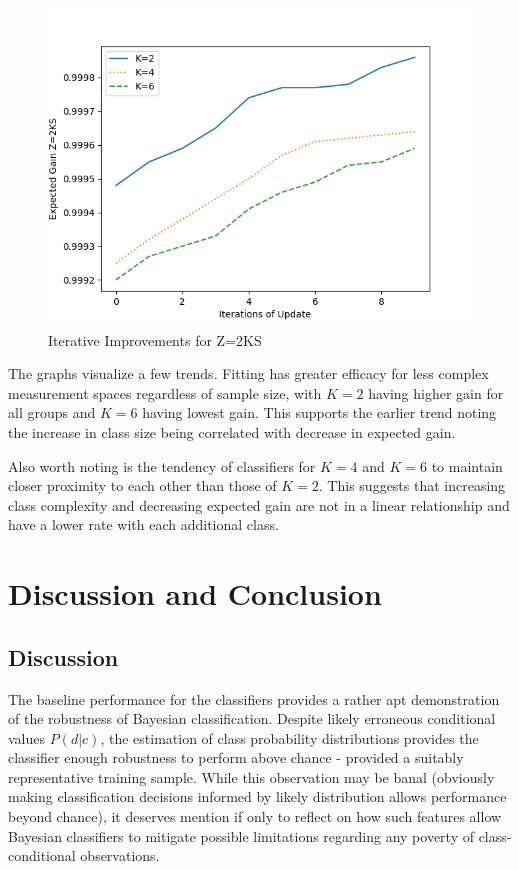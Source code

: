 \documentclass[10pt, conference]{IEEEtran}
\begin{document}
\begin{figure}[htbp]
\centerline{\includegraphics[scale=0.5]{Z_2KS.png}}
\caption{Iterative Improvements for Z=2KS}
\label{fig}
\end{figure}
The graphs visualize a few trends. Fitting has greater efficacy for less complex measurement spaces regardless of sample size, with $K=2$ having higher gain for all groups and $K=6$ having lowest gain. This supports the earlier trend noting the increase in class size being correlated with decrease in expected gain.

Also worth noting is the tendency of classifiers for $K=4$ and $K=6$ to maintain closer proximity to each other than those of $K=2$. This suggests that increasing class complexity and decreasing expected gain are not in a linear relationship and have a lower rate with each additional class. 
\section{Discussion and Conclusion}
\subsection{Discussion}
The baseline performance  for the classifiers provides a rather apt demonstration of the robustness of Bayesian classification. Despite likely erroneous conditional values $P(d|c)$, the estimation of class probability distributions provides the classifier enough robustness to perform above chance - provided a suitably representative training sample. While this observation may be banal (obviously making classification decisions informed by likely distribution allows performance beyond chance), it deserves mention if only to reflect on how such features allow Bayesian classifiers to mitigate possible limitations regarding any poverty of class-conditional observations.
\end{document}
